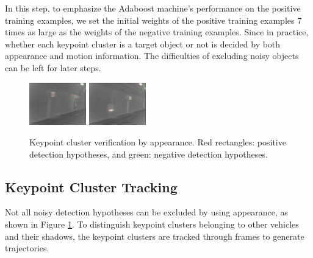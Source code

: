 \documentclass{JoITSRstyle}
\begin{document}
In this step, to emphasize the Adaboost machine's performance on the positive training examples, we set the initial weights of the positive training examples 7 times as large as the weights of the negative training examples.  Since in practice, whether each keypoint cluster is a target object or not is decided by both appearance and motion information. The difficulties of excluding noisy objects can be left for later steps.
\begin{figure}[b]
\includegraphics[width=0.22\textwidth,bb=0 0 640 480]{17Rgsimg00039.ps}
\includegraphics[width=0.22\textwidth,bb=0 0 640 480]{8Rgsimg00028.ps}
\caption{Keypoint cluster verification by appearance. Red rectangles: positive detection hypotheses, and green: negative detection hypotheses.}
\label{fig:fif}
\end{figure}
\subsection{Keypoint Cluster Tracking}
Not all noisy detection hypotheses can be excluded by using appearance, as shown in Figure \ref{fig:fif}. To distinguish keypoint clusters belonging to other vehicles and their shadows, the keypoint clusters are tracked through frames to generate trajectories.
\end{document}
